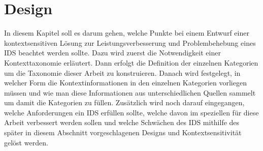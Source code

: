 \chapter{Design}%
\label{cha:design}

In diesem Kapitel soll es darum gehen, welche Punkte bei einem Entwurf einer kontextsensitiven Lösung zur Leistungsverbesserung und Problembehebung eines IDS beachtet werden sollte. Dazu wird zuerst die Notwendigkeit einer Kontexttaxonomie erläutert. Dann erfolgt die Definition der einzelnen Kategorien um die Taxonomie dieser Arbeit zu konstruieren. Danach wird festgelegt, in welcher Form die Kontextinformationen in den einzelnen Kategorien vorliegen müssen und wie man diese Informationen aus unterschiedlichen Quellen sammelt um damit die Kategorien zu füllen. Zusätzlich wird noch darauf eingegangen, welche Anforderungen ein IDS erfüllen sollte, welche davon im speziellen für diese Arbeit verbessert werden sollen und welche Schwächen des IDS mithilfe des später in diesem Abschnitt vorgeschlagenen Designs und Kontextsensitivität gelöst werden.

